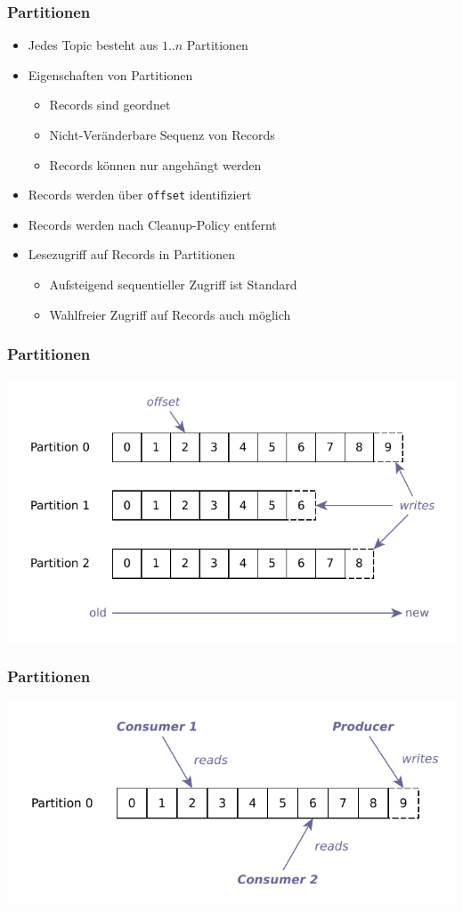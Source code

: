 \begin{frame}
\frametitle{Partitionen}
\begin{itemize}
	\item Jedes Topic besteht aus $1..n$ Partitionen
	\item Eigenschaften von Partitionen
	\begin{itemize}
		\item Records sind geordnet
		\item Nicht-Veränderbare Sequenz von Records
		\item Records können nur angehängt werden
	\end{itemize}
	\item Records werden über \texttt{offset} identifiziert
	\item Records werden nach Cleanup-Policy entfernt
	\item Lesezugriff auf Records in Partitionen
	\begin{itemize}
		\item Aufsteigend sequentieller Zugriff ist Standard
		\item Wahlfreier Zugriff auf Records auch möglich
	\end{itemize}
\end{itemize}
\end{frame}

\begin{frame}
\frametitle{Partitionen}
	\centering
	\includegraphics[scale=0.75]{figure/partitioned_log.pdf}
\end{frame}

\begin{frame}
\frametitle{Partitionen}
\centering
\includegraphics[scale=0.75]{figure/partition.pdf}
\end{frame}

